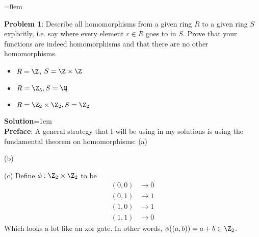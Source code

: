 \documentclass{article}
\begin{document}
\newpage\parskip=0em
\begin{mdframed}[backgroundcolor=blue!20]
\textbf{Problem 1}: Describe all homomorphisms from a given ring $R$ to a given ring $S$ explicitly, i.e. say where every element $r\in R$ goes to in $S$. Prove that your functions are indeed homomorphisms and that there are no other homomorphisms.
\begin{itemize}
    \item $R = \Z$, $S = \Z \times \Z$
    \item $R = \Z_5, S = \Q$
    \item $R = \Z_2 \times \Z_2, S = \Z_2$
\end{itemize}
\end{mdframed}
\textbf{Solution}\parskip=1em\\
\textbf{Preface}: A general strategy that I will be using in my solutions is using the fundamental theorem on homomorphisms: 
(a)

(b)

(c) Define $\phi : \Z_2 \times \Z_2$ to be 
\begin{align*}
    (0, 0) &\to 0\\  
    (0, 1) &\to 1\\
    (1, 0) &\to 1\\
    (1, 1) &\to 0
\end{align*}
Which looks a lot like an xor gate. In other words, $\phi((a, b)) = a + b \in \Z_2$.
\end{document}
